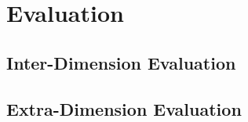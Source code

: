 \section{Evaluation}
\subsection{Inter-Dimension Evaluation}
\subsection{Extra-Dimension Evaluation}